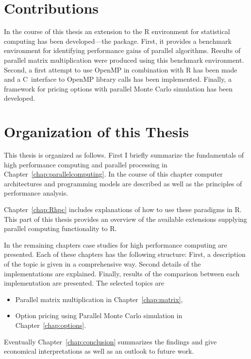 \section{Contributions}
In the course of this thesis an extension to the R
environment for statistical computing has been developed---the
 package. First, it provides a benchmark environment for
identifying performance gains of parallel algorithms. Results of
parallel matrix multiplication were produced using this benchmark
environment. Second, a first
attempt to use OpenMP in combination with R has been made and a
C~interface to OpenMP library calls has been implemented. Finally,
a framework for pricing options with parallel Monte Carlo simulation
has been developed.
 
\section{Organization of this Thesis}

This thesis is organized as follows. First I briefly summarize the
fundamentals of high performance computing and parallel processing in
Chapter~\ref{chap:parallelcomputing}. In the course of this chapter
computer architectures and programming models are described as well as the
principles of performance analysis.

Chapter~\ref{chap:Rhpc} includes explanations of how to use these
paradigms in R. This part of
this thesis provides an overview of the
available extensions supplying parallel computing functionality to R.

In the remaining chapters case studies for high performance
computing are presented. Each of these chapters has the following
structure: First,
a description of the topic is given in a comprehensive way. Second
details of the implementations are explained. Finally, results of the
comparison between each implementation are presented. The selected
topics are
\begin{itemize}
\item Parallel matrix multiplication in Chapter~\ref{chap:matrix},
\item Option pricing using Parallel Monte Carlo simulation in
  Chapter~\ref{chap:options}. 
\end{itemize}
Eventually Chapter~\ref{chap:conclusion} summarizes
the findings and give economical interpretations as well as an outlook
to future work.
